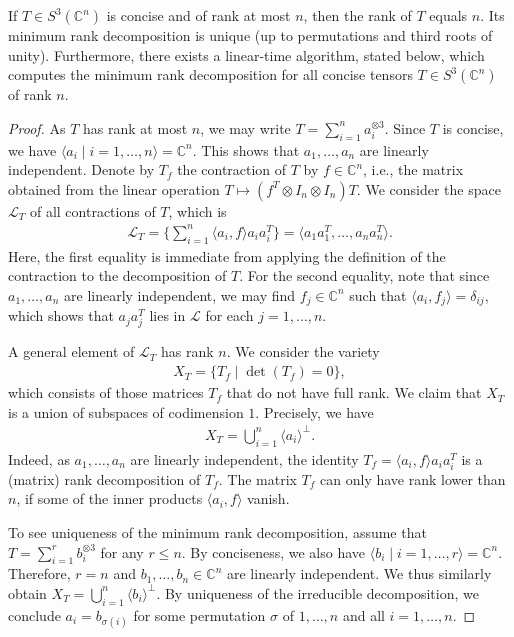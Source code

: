 \begin{theorem}
	\label{tensorAlgorithms-theorem-3tensor}
	If $ T \in S^3(\mathbb C^n) $ is concise and of rank at most $ n $, then the rank of $ T $ equals $ n $. Its minimum rank decomposition is unique (up to permutations and third roots of unity).
	Furthermore, there exists a linear-time algorithm, stated below, which computes the minimum rank decomposition for all concise tensors $ T\in S^3(\mathbb C^n) $ of rank $ n $. 
\end{theorem}
\begin{proof}
	As $ T $ has rank at most $ n $, we may write $ T = \sum_{i = 1}^{n} a_i^{\otimes 3} $. Since $ T $ is concise, we have $ \langle a_i \mid i=1,\ldots,n \rangle = \mathbb{C}^n $. This shows that $ a_1,\ldots,a_n $ are linearly independent. Denote by $ T_f $ the contraction of $ T $ by $ f \in \mathbb{C}^n $, i.e., the matrix obtained from the linear operation $ T\mapsto (f^{T} \otimes I_n \otimes I_n) T $. We consider the space $ \mathcal{L}_T $ of all contractions of $ T $, which is
	\begin{align*}
		\mathcal{L}_T = \{\sum_{i = 1}^{n} \langle a_i, f \rangle a_ia_i^{T} \} = \langle a_1a_1^{T},\ldots,a_na_n^{T} \rangle. 
	\end{align*}
	Here, the first equality is immediate from applying the definition of the contraction to the decomposition of $ T $. For the second equality, note that since $ a_1,\ldots,a_n $ are linearly independent, we may find $ f_j\in \mathbb{C}^n $ such that $ \langle a_i, f_j \rangle = \delta_{ij} $, which shows that $ a_ja_j^{T} $ lies in $ \mathcal{L} $ for each $ j = 1,\ldots,n $. 
	
	A general element of $ \mathcal{L}_T $ has rank $ n $. We consider the variety 
	\begin{align*}
		X_T = \{T_f \mid \det(T_f) = 0\}, 
	\end{align*}
	which consists of those matrices $ T_f $ that do not have full rank. We claim that $ X_T $ is a union of subspaces of codimension $ 1 $. Precisely, we have 
	\begin{align*}
		X_T = \bigcup_{i = 1}^n \langle a_i \rangle^{\perp}. 
	\end{align*} 
	Indeed, as $ a_1,\ldots,a_n $ are linearly independent, the identity $ T_f = \langle a_i, f \rangle a_ia_i^{T} $ is a (matrix) rank decomposition of $ T_f $. The matrix $ T_f $ can only have rank lower than $ n $, if some of the inner products $ \langle a_i, f \rangle $ vanish. 
	
	To see uniqueness of the minimum rank decomposition, assume that $ T = \sum_{i = 1}^{r} b_i^{\otimes 3} $ for any $ r\le n $. By conciseness, we also have $ \langle b_i \mid i=1,\ldots,r \rangle = \mathbb{C}^n $. Therefore, $ r = n $ and $ b_1,\ldots,b_n\in \mathbb{C}^n $ are linearly independent. We thus similarly obtain $ X_T = \bigcup_{i = 1}^n \langle b_i \rangle^{\perp}$. By uniqueness of the irreducible decomposition, we conclude $ a_i = b_{\sigma(i)} $ for some permutation $ \sigma $ of $ 1,\ldots,n $ and all $ i = 1,\ldots,n $.  
\end{proof}

